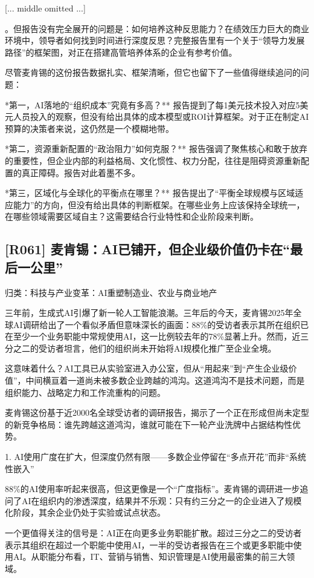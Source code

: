 \documentclass[11pt]{ctexart}
\begin{document}
[... middle omitted ...]

。但报告没有完全展开的问题是：如何培养这种反思能力？在绩效压力巨大的商业环境中，领导者如何找到时间进行深度反思？完整报告里有一个关于“领导力发展路径”的框架图，对正在搭建高管培养体系的企业有参考价值。

尽管麦肯锡的这份报告数据扎实、框架清晰，但它也留下了一些值得继续追问的问题：

*第一，AI落地的“组织成本”究竟有多高？** 报告提到了每1美元技术投入对应5美元人员投入的观察，但没有给出具体的成本模型或ROI计算框架。对于正在制定AI预算的决策者来说，这仍然是一个模糊地带。

*第二，资源重新配置的“政治阻力”如何克服？** 报告强调了聚焦核心和敢于放弃的重要性，但企业内部的利益格局、文化惯性、权力分配，往往是阻碍资源重新配置的真正障碍。报告对此着墨不多。

*第三，区域化与全球化的平衡点在哪里？** 报告提出了“平衡全球规模与区域适应能力”的方向，但没有给出具体的判断框架。在哪些业务上应该保持全球统一，在哪些领域需要区域自主？这需要结合行业特性和企业阶段来判断。

\subsection{[R061] 麦肯锡：AI已铺开，但企业级价值仍卡在“最后一公里”}
{\small\color{refgray}归类：科技与产业变革：AI重塑制造业、农业与商业地产}

三年前，生成式AI引爆了新一轮人工智能浪潮。三年后的今天，麦肯锡2025年全球AI调研给出了一个看似矛盾但意味深长的画面：88\%的受访者表示其所在组织已在至少一个业务职能中常规使用AI，这一比例较去年的78\%显著上升。然而，近三分之二的受访者坦言，他们的组织尚未开始将AI规模化推广至企业全境。

这意味着什么？AI工具已从实验室进入办公室，但从“用起来”到“产生企业级价值”，中间横亘着一道尚未被多数企业跨越的鸿沟。这道鸿沟不是技术问题，而是组织能力、战略定力和工作流重构的问题。

麦肯锡这份基于近2000名全球受访者的调研报告，揭示了一个正在形成但尚未定型的新竞争格局：谁先跨越这道鸿沟，谁就可能在下一轮产业洗牌中占据结构性优势。

1. AI使用广度在扩大，但深度仍然有限——多数企业停留在“多点开花”而非“系统性嵌入”

88\%的AI使用率听起来很高，但这更像是一个“广度指标”。麦肯锡的调研进一步追问了AI在组织内的渗透深度，结果并不乐观：只有约三分之一的企业进入了规模化阶段，其余企业仍处于实验或试点状态。

一个更值得关注的信号是：AI正在向更多业务职能扩散。超过三分之二的受访者表示其组织在超过一个职能中使用AI，一半的受访者报告在三个或更多职能中使用AI。从职能分布看，IT、营销与销售、知识管理是AI使用最密集的前三大领域。
\end{document}
